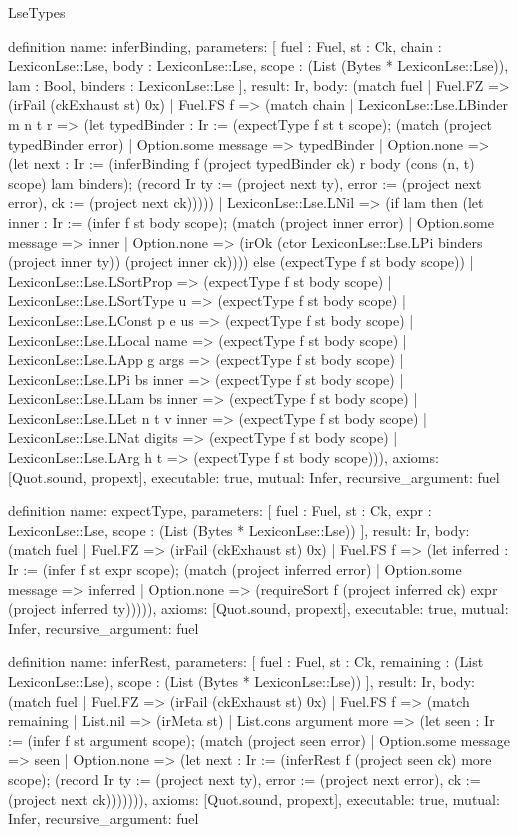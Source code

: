 \begin{lexlean}{LseTypes}
\begin{semanticmodule}
definition{
  name: inferBinding,
  parameters: [
    fuel : Fuel,
    st : Ck,
    chain : LexiconLse::Lse,
    body : LexiconLse::Lse,
    scope : (List (Bytes * LexiconLse::Lse)),
    lam : Bool,
    binders : LexiconLse::Lse
  ],
  result: Ir,
  body: (match fuel
    | Fuel.FZ => (irFail (ckExhaust st) 0x)
    | Fuel.FS f => (match chain
      | LexiconLse::Lse.LBinder m n t r => (let typedBinder : Ir := (expectType f st t scope); (match (project typedBinder error)
        | Option.some message => typedBinder
        | Option.none => (let next : Ir := (inferBinding f (project typedBinder ck) r body (cons (n, t) scope) lam binders); (record Ir {ty := (project next ty), error := (project next error), ck := (project next ck)}))))
      | LexiconLse::Lse.LNil => (if lam then (let inner : Ir := (infer f st body scope); (match (project inner error)
        | Option.some message => inner
        | Option.none => (irOk (ctor LexiconLse::Lse.LPi binders (project inner ty)) (project inner ck)))) else (expectType f st body scope))
      | LexiconLse::Lse.LSortProp => (expectType f st body scope)
      | LexiconLse::Lse.LSortType u => (expectType f st body scope)
      | LexiconLse::Lse.LConst p e us => (expectType f st body scope)
      | LexiconLse::Lse.LLocal name => (expectType f st body scope)
      | LexiconLse::Lse.LApp g args => (expectType f st body scope)
      | LexiconLse::Lse.LPi bs inner => (expectType f st body scope)
      | LexiconLse::Lse.LLam bs inner => (expectType f st body scope)
      | LexiconLse::Lse.LLet n t v inner => (expectType f st body scope)
      | LexiconLse::Lse.LNat digits => (expectType f st body scope)
      | LexiconLse::Lse.LArg h t => (expectType f st body scope))),
  axioms: [Quot.sound, propext],
  executable: true,
  mutual: Infer,
  recursive_argument: fuel
}

definition{
  name: expectType,
  parameters: [
    fuel : Fuel,
    st : Ck,
    expr : LexiconLse::Lse,
    scope : (List (Bytes * LexiconLse::Lse))
  ],
  result: Ir,
  body: (match fuel
    | Fuel.FZ => (irFail (ckExhaust st) 0x)
    | Fuel.FS f => (let inferred : Ir := (infer f st expr scope); (match (project inferred error)
      | Option.some message => inferred
      | Option.none => (requireSort f (project inferred ck) expr (project inferred ty))))),
  axioms: [Quot.sound, propext],
  executable: true,
  mutual: Infer,
  recursive_argument: fuel
}

definition{
  name: inferRest,
  parameters: [
    fuel : Fuel,
    st : Ck,
    remaining : (List LexiconLse::Lse),
    scope : (List (Bytes * LexiconLse::Lse))
  ],
  result: Ir,
  body: (match fuel
    | Fuel.FZ => (irFail (ckExhaust st) 0x)
    | Fuel.FS f => (match remaining
      | List.nil => (irMeta st)
      | List.cons argument more => (let seen : Ir := (infer f st argument scope); (match (project seen error)
        | Option.some message => seen
        | Option.none => (let next : Ir := (inferRest f (project seen ck) more scope); (record Ir {ty := (project next ty), error := (project next error), ck := (project next ck)})))))),
  axioms: [Quot.sound, propext],
  executable: true,
  mutual: Infer,
  recursive_argument: fuel
}


\end{semanticmodule}
\end{lexlean}

